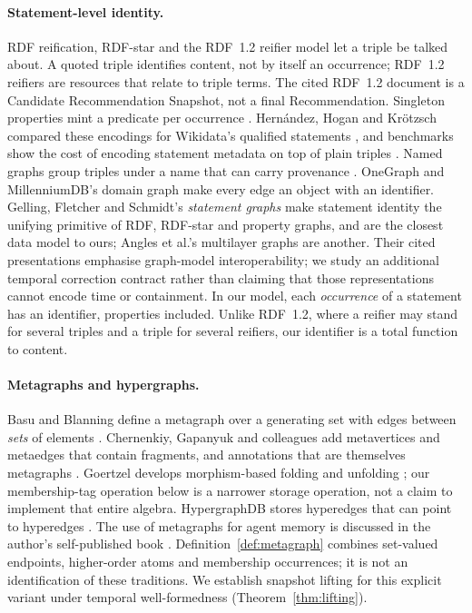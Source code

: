 \documentclass[11pt]{article}
\theoremstyle{plain}
\theoremstyle{definition}
\theoremstyle{remark}
\begin{document}
\paragraph{Statement-level identity.}
RDF reification, RDF-star \cite{hartig2017rdfstar} and the RDF~1.2 reifier
model \cite{w3c2026rdf12concepts} let a triple be talked about.
A quoted triple identifies content, not by itself an occurrence; RDF~1.2 reifiers
are resources that relate to triple terms. The cited RDF~1.2 document is a
Candidate Recommendation Snapshot, not a final Recommendation. Singleton
properties mint a predicate per occurrence \cite{nguyen2014singleton}.
Hern\'andez, Hogan and Kr\"otzsch compared these encodings for Wikidata's
qualified statements \cite{vrandecic2014wikidata,hernandez2015reifying}, and
benchmarks show the cost of encoding statement metadata on top of plain triples
\cite{frey2019metadata,orlandi2021benchmarking}. Named graphs group triples
under a name that can carry provenance \cite{carroll2005named}. OneGraph
\cite{lassila2023onegraph} and MillenniumDB's domain graph
\cite{vrgoc2023millenniumdb} make every edge an object with an identifier. Gelling, Fletcher and Schmidt's
\emph{statement graphs} \cite{gelling2024statement} make statement identity the
unifying primitive of RDF, RDF-star and property graphs, and are the closest data
model to ours; Angles et al.'s multilayer graphs \cite{angles2022multilayer} are
another. Their cited presentations emphasise graph-model interoperability;
we study an additional temporal correction contract rather than claiming that
those representations cannot encode time or containment. In our model, each \emph{occurrence} of a
statement has an identifier, properties included. Unlike RDF~1.2, where a
reifier may stand for several triples and a triple for several reifiers, our
identifier is a total function to content.

\paragraph{Metagraphs and hypergraphs.}
Basu and Blanning define a metagraph over a generating set with edges between
\emph{sets} of elements \cite{basu2007metagraphs}. Chernenkiy, Gapanyuk and
colleagues add metavertices and metaedges that contain fragments, and
annotations that are themselves metagraphs \cite{chernenkiy2017rdf,gapanyuk2021development}.
Goertzel develops morphism-based folding and unfolding \cite{goertzel2020folding};
our membership-tag operation below is a narrower storage operation, not a
claim to implement that entire algebra. HypergraphDB stores hyperedges that can point
to hyperedges \cite{iordanov2010hypergraphdb}. The use of metagraphs for agent
memory is discussed in the author's self-published book \cite{pavlyshyn2026metagraph}.
Definition~\ref{def:metagraph} combines set-valued endpoints, higher-order atoms
and membership occurrences; it is not an identification of these traditions.
We establish snapshot lifting for this explicit variant under temporal
well-formedness (Theorem~\ref{thm:lifting}).
\end{document}
